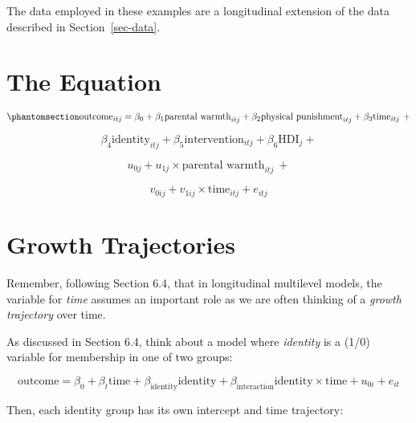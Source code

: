 \documentclass[
  letterpaper,
  DIV=11,
  numbers=noendperiod]{scrreprt}
\begin{document}
The data employed in these examples are a longitudinal extension of the
data described in Section~\ref{sec-data}.

\section{The Equation}\label{the-equation-2}

\begin{equation}\phantomsection\label{eq-MLM-longitudinal}{\text{outcome}_{itj} = \beta_0 + \beta_1 \text{parental warmth}_{itj} + \beta_2 \text{physical punishment}_{itj} + \beta_3 \text{time}_{itj} \ + }\end{equation}

\[\beta_4 \text{identity}_{itj} + \beta_5 \text{intervention}_{itj} + \beta_6 \text{HDI}_{j} +\]

\[u_{0j} + u_{1j} \times \text{parental warmth}_{itj} \ + \]

\[v_{0ij} + v_{1ij} \times \text{time}_{itj} + e_{itj}\]

\section{Growth Trajectories}\label{growth-trajectories}

Remember, following Section 6.4, that in longitudinal multilevel models,
the variable for \emph{time} assumes an important role as we are often
thinking of a \emph{growth trajectory} over time.

As discussed in Section 6.4, think about a model where \emph{identity}
is a (1/0) variable for membership in one of two groups:

\[\text{outcome} = \beta_0 + \beta_t \text{time} + \beta_\text{identity} \text{identity} + \beta_\text{interaction} \text{identity} \times \text{time} + u_{0i} + e_{it}\]

Then, each identity group has its own intercept and time trajectory:
\end{document}
